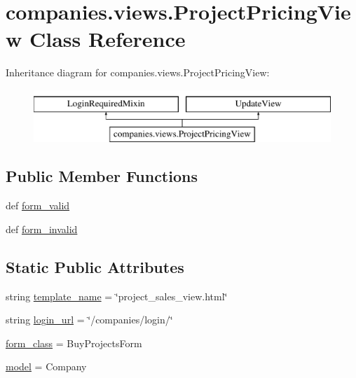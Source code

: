 \hypertarget{classcompanies_1_1views_1_1_project_pricing_view}{\section{companies.\-views.\-Project\-Pricing\-View Class Reference}
\label{classcompanies_1_1views_1_1_project_pricing_view}
}
Inheritance diagram for companies.\-views.\-Project\-Pricing\-View\-:\begin{figure}[H]
\begin{center}
\leavevmode
\includegraphics[height=2.000000cm]{classcompanies_1_1views_1_1_project_pricing_view}
\end{center}
\end{figure}
\subsection*{Public Member Functions}
\begin{DoxyCompactItemize}
\item 
def \hyperlink{classcompanies_1_1views_1_1_project_pricing_view_adcc2d0263363355b9ba8cdb774986fc9}{form\-\_\-valid}
\item 
def \hyperlink{classcompanies_1_1views_1_1_project_pricing_view_a93244fb14e4f04af8ea6bb85df5ef50f}{form\-\_\-invalid}
\end{DoxyCompactItemize}
\subsection*{Static Public Attributes}
\begin{DoxyCompactItemize}
\item 
string \hyperlink{classcompanies_1_1views_1_1_project_pricing_view_aeca873db75628ed403d572965ab073e8}{template\-\_\-name} = \char`\"{}project\-\_\-sales\-\_\-view.\-html\char`\"{}
\item 
string \hyperlink{classcompanies_1_1views_1_1_project_pricing_view_a4ffe00eab2fef7cd56485e34d60a0c65}{login\-\_\-url} = \char`\"{}/companies/login/\char`\"{}
\item 
\hyperlink{classcompanies_1_1views_1_1_project_pricing_view_a2122dd5ba11f1cb27a4c87087a29ee5e}{form\-\_\-class} = Buy\-Projects\-Form
\item 
\hyperlink{classcompanies_1_1views_1_1_project_pricing_view_a48f57d591511570a1c97a9a1cc626595}{model} = Company
\end{DoxyCompactItemize}



